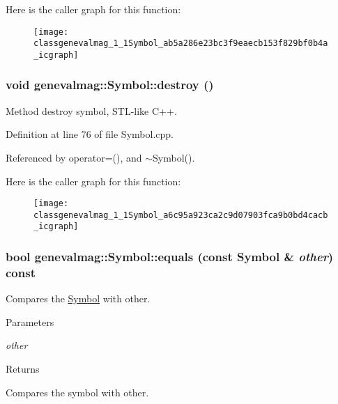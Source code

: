 Here is the caller graph for this function:\nopagebreak
\begin{figure}[H]
\begin{center}
\leavevmode
\texttt{[image: classgenevalmag\_1\_1Symbol\_ab5a286e23bc3f9eaecb153f829bf0b4a\_icgraph]}
\end{center}
\end{figure}


\hypertarget{classgenevalmag_1_1Symbol_a6c95a923ca2c9d07903fca9b0bd4cacb}{
\subsubsection[{destroy}]{\setlength{\rightskip}{0pt plus 5cm}void genevalmag::Symbol::destroy ()}}
\label{classgenevalmag_1_1Symbol_a6c95a923ca2c9d07903fca9b0bd4cacb}
Method destroy symbol, STL-\/like C++. 

Definition at line 76 of file Symbol.cpp.



Referenced by operator=(), and $\sim$Symbol().



Here is the caller graph for this function:\nopagebreak
\begin{figure}[H]
\begin{center}
\leavevmode
\texttt{[image: classgenevalmag\_1\_1Symbol\_a6c95a923ca2c9d07903fca9b0bd4cacb\_icgraph]}
\end{center}
\end{figure}


\hypertarget{classgenevalmag_1_1Symbol_a17e303be01f4c9cd3c1b167179d6e0aa}{
\subsubsection[{equals}]{\setlength{\rightskip}{0pt plus 5cm}bool genevalmag::Symbol::equals (const {\bf Symbol} \& {\em other}) const}}
\label{classgenevalmag_1_1Symbol_a17e303be01f4c9cd3c1b167179d6e0aa}
Compares the \hyperlink{classgenevalmag_1_1Symbol}{Symbol} with other. 
\begin{DoxyParams}{Parameters}
\item[{\em other}]\end{DoxyParams}
\begin{DoxyReturn}{Returns}

\end{DoxyReturn}
Compares the symbol with other. 

